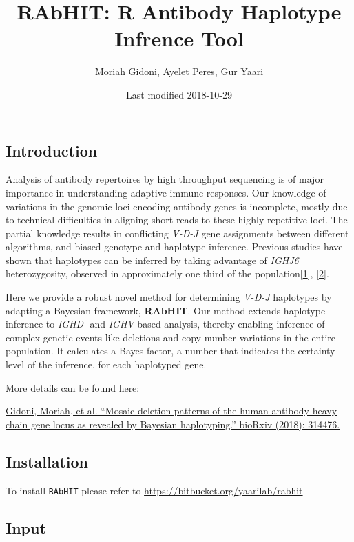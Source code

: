 \documentclass[11pt,]{article}
\title{RAbHIT: R Antibody Haplotype Infrence Tool}
\author{Moriah Gidoni, Ayelet Peres, Gur Yaari}
\date{Last modified 2018-10-29}
\begin{document}
\maketitle

{
\hypersetup{linkcolor=black}
\setcounter{tocdepth}{2}
\tableofcontents
}
\subsection{Introduction}\label{introduction}

Analysis of antibody repertoires by high throughput sequencing is of
major importance in understanding adaptive immune responses. Our
knowledge of variations in the genomic loci encoding antibody genes is
incomplete, mostly due to technical difficulties in aligning short reads
to these highly repetitive loci. The partial knowledge results in
conflicting \emph{V-D-J} gene assignments between different algorithms,
and biased genotype and haplotype inference. Previous studies have shown
that haplotypes can be inferred by taking advantage of \emph{IGHJ6}
heterozygosity, observed in approximately one third of the
population{[}\protect\hyperlink{ref-kidd_inference_2012}{1}{]},
{[}\protect\hyperlink{ref-kirik2017parallel}{2}{]}.

Here we provide a robust novel method for determining \emph{V-D-J}
haplotypes by adapting a Bayesian framework, \textbf{RAbHIT}. Our method
extends haplotype inference to \emph{IGHD}- and \emph{IGHV}-based
analysis, thereby enabling inference of complex genetic events like
deletions and copy number variations in the entire population. It
calculates a Bayes factor, a number that indicates the certainty level
of the inference, for each haplotyped gene.

More details can be found here:

\href{https://doi.org/10.1101/314476}{Gidoni, Moriah, et al. ``Mosaic
deletion patterns of the human antibody heavy chain gene locus as
revealed by Bayesian haplotyping.'' bioRxiv (2018): 314476.}

\subsection{Installation}\label{installation}

To install \texttt{RAbHIT} please refer to
\url{https://bitbucket.org/yaarilab/rabhit}

\subsection{Input}\label{input}
\end{document}

